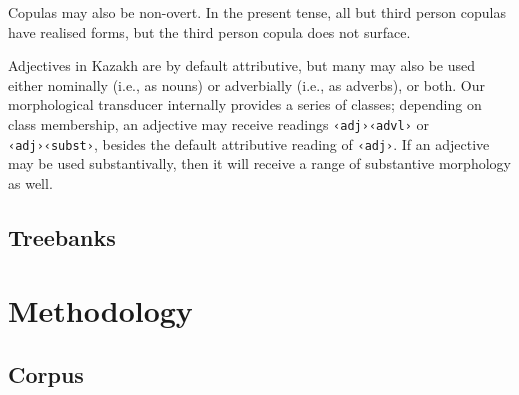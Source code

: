 \documentclass[a4paper,11pt, onecolumn,twoside]{article}
\newcommand{\tag}[1]{\texttt{‹#1›}}
\begin{document}
Copulas may also be non-overt.  In the present tense, all but third person copulas have realised forms, but the third person copula does not surface.

Adjectives in Kazakh are by default attributive, but many may also be used either nominally (i.e., as nouns) or adverbially (i.e., as adverbs), or both.  Our morphological transducer internally provides a series of classes; depending on class membership, an adjective may receive readings \tag{adj}\tag{advl} or \tag{adj}\tag{subst}, besides the default attributive reading of \tag{adj}.  If an adjective may be used substantivally, then it will receive a range of substantive morphology as well.


\subsection{Treebanks} %


\section{Methodology}

\subsection{Corpus}
\end{document}
